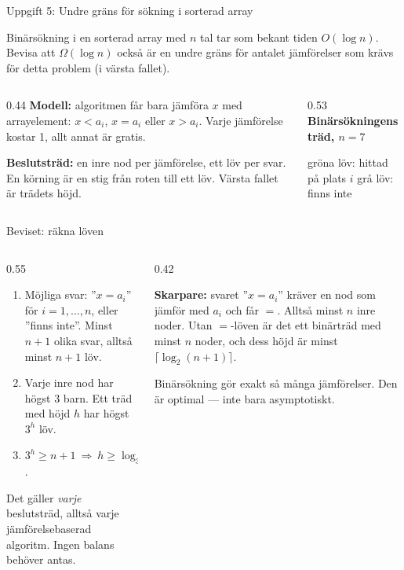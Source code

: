 \begin{frame}{Uppgift 5: Undre gräns för sökning i sorterad array}
\begin{infobox}
Binärsökning i en sorterad array med $n$ tal tar som bekant tiden $O(\log n)$. Bevisa att
$\Omega(\log n)$ också är en undre gräns för antalet jämförelser som krävs för detta problem
(i värsta fallet).
\end{infobox}
\begin{columns}[T]
\begin{column}{0.44\textwidth}
\small
\textbf{Modell:} algoritmen får bara jämföra $x$ med arrayelement: $x<a_i$, $x=a_i$ eller
$x>a_i$. Varje jämförelse kostar 1, allt annat är gratis.\par\smallskip
\textbf{Beslutsträd:} en inre nod per jämförelse, ett löv per svar. En körning är en stig från
roten till ett löv. Värsta fallet är trädets höjd.
\end{column}
\begin{column}{0.53\textwidth}
\centering
{\footnotesize\bfseries\color{kthnavy}Binärsökningens träd, $n=7$}\par\smallskip
\par
{\scriptsize\textcolor{kthgreen}{gröna löv}: hittad på plats $i$\quad
\textcolor{black!50}{grå löv}: finns inte}
\end{column}
\end{columns}
\end{frame}

\begin{frame}{Beviset: räkna löven}
\begin{columns}[T]
\begin{column}{0.55\textwidth}
\small
\begin{enumerate}\setlength{\itemsep}{3pt}
  \item Möjliga svar: ”$x=a_i$” för $i=1,\dots,n$, eller ”finns inte”. Minst $n+1$ olika svar,
        alltså minst $n+1$ löv.
  \item Varje inre nod har högst 3 barn. Ett träd med höjd $h$ har högst $3^h$ löv.
  \item $3^h\ge n+1\ \Rightarrow\ h\ge\log_3(n+1)=\Omega(\log n)$.
\end{enumerate}
\medskip
Det gäller \emph{varje} beslutsträd, alltså varje jämförelsebaserad algoritm. Ingen balans
behöver antas.
\end{column}
\begin{column}{0.42\textwidth}
\begin{ahabox}[fontupper=\footnotesize]
\textbf{Skarpare:} svaret ”$x=a_i$” kräver en nod som jämför med $a_i$ och får $=$.
Alltså minst $n$ inre noder. Utan $=$-löven är det ett binärträd med minst $n$ noder, och
dess höjd är minst $\lceil\log_2(n+1)\rceil$.\par\smallskip
Binärsökning gör exakt så många jämförelser. Den är optimal — inte bara asymptotiskt.
\end{ahabox}
\end{column}
\end{columns}
\vfill
{}
\end{frame}

